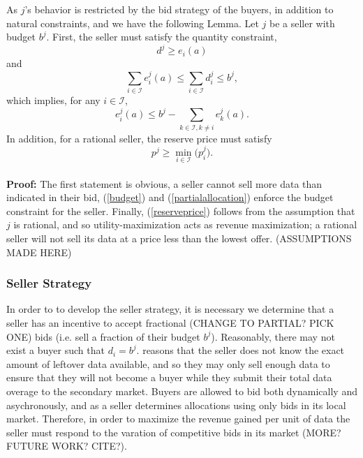 \documentclass[12pt]{article}
\theoremstyle{definition}
\newcommand{\mcI}{\mathcal{I}}
\begin{document}
\begin{multicols}{2}
As $j$'s behavior is restricted by
the bid strategy of the buyers, in addition to natural constraints, and we have the following Lemma.
{
\label{constraints}
Let $j$ be a seller with budget $b^j$.
First, the seller must satisfy the quantity
constraint, 
\begin{equation}\label{quantity}
    d^j \ge e_i(a)
\end{equation}
and
\begin{equation}\label{budget}
    \displaystyle\sum_{i\in\mcI} e_i^j(a) \le \sum_{i\in\mcI} d^j_i \le b^j,
\end{equation}
which implies, for any $i\in\mcI$,
\begin{equation}\label{partialallocation}
    e_i^j(a) \le b^j - \sum_{k\in\mcI, k\ne i} e_k^j(a).
\end{equation}
In addition, for a rational seller, the reserve price must
satisfy 
\begin{equation}\label{reserveprice}
   p^j \ge \min_{i\in\mcI}\big(p_i^j).
\end{equation}
}\\
\textbf{Proof:}
The first statement is obvious, 
a seller cannot sell more data than indicated in their bid, (\ref{budget}) and
(\ref{partialallocation}) enforce
the budget constraint for the seller. Finally, (\ref{reserveprice})
follows from the assumption that $j$ is rational, and so utility-maximization
acts as revenue maximization; a rational seller will not sell its
data at a price less than the lowest offer. (ASSUMPTIONS MADE HERE)


\subsubsection{Seller Strategy}
In order to to develop the seller strategy, it is necessary we determine 
that a seller has an incentive to
accept fractional (CHANGE TO PARTIAL? PICK ONE) bids (i.e. sell a fraction of
their budget $b^j$). Reasonably,
there may not exist a buyer such that $d_i = b^j$. \cite{zheng} reasons that the seller does not know the exact amount of
leftover data available, and so they may only sell enough data to ensure that
they will not become a buyer while they submit their total data overage to the
secondary market. Buyers are allowed to
bid both dynamically and asychronously, and as a seller determines allocations using only bids
in its local market. Therefore, in order to
maximize the revenue gained per unit of data the seller must respond to the
varation of competitive bids in its market (MORE? FUTURE WORK? CITE?).


\end{multicols}
\end{document}
